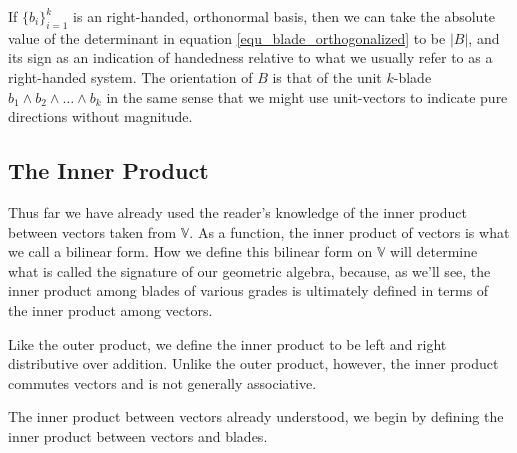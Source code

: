 \documentclass[12pt]{article}
\numberwithin{equation}{section}
\newcommand{\V}{\mathbb{V}}
\begin{document}
If $\{b_i\}_{i=1}^k$ is an right-handed, orthonormal basis,
then we can take the absolute value of the determinant in equation
\eqref{equ_blade_orthogonalized} to be $|B|$, and its sign as an
indication of handedness relative to what we usually refer to as a right-handed system.
The orientation of $B$ is that of the unit $k$-blade $b_1\wedge b_2\wedge\dots\wedge b_k$
in the same sense that we might use unit-vectors to indicate pure directions without magnitude.

\subsection{The Inner Product}

Thus far we have already used the reader's knowledge of the inner product
between vectors taken from $\V$.  As a function, the inner product of vectors is
what we call a bilinear form.  How we define this bilinear form on $\V$ will determine
what is called the signature of our geometric algebra, because, as we'll see,
the inner product among blades of various grades is ultimately defined
in terms of the inner product among vectors.

Like the outer product, we define the inner product to be left and
right distributive over addition.  Unlike the outer product, however,
the inner product commutes vectors and is not generally associative.

The inner product between vectors already understood, we begin
by defining the inner product between vectors and blades.
\end{document}
